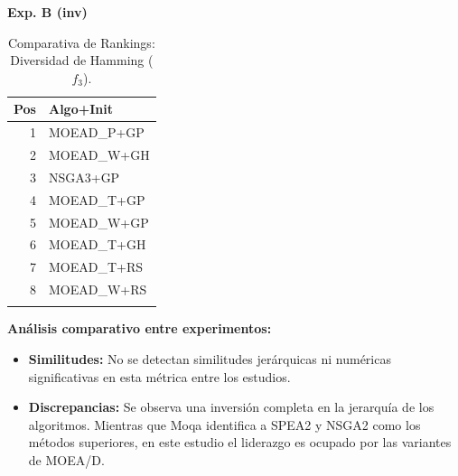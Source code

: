 \documentclass[a4paper,10pt]{article}
\begin{document}
\begin{table}[H]
\begin{minipage}[t]{0.32\textwidth}
        \centering\scriptsize\textbf{Exp. B (inv)}\\
        \begin{tabular}{rl}
            \toprule
            Pos & Algo+Init \\ \midrule
            1 & MOEAD\_P+GP \\
            2 & MOEAD\_W+GH \\
            3 & NSGA3+GP \\
            4 & MOEAD\_T+GP \\
            5 & MOEAD\_W+GP \\
            6 & MOEAD\_T+GH \\
            7 & MOEAD\_T+RS \\
            8 & MOEAD\_W+RS \\
            \\
            \bottomrule
        \end{tabular}
    \end{minipage}
    \caption{Comparativa de Rankings: Diversidad de Hamming ($f_3$).}
\end{table}

\textbf{Análisis comparativo entre experimentos:}
\begin{itemize}
    \item \textbf{Similitudes:} No se detectan similitudes jerárquicas ni numéricas significativas en esta métrica entre los estudios.
    \item \textbf{Discrepancias:} Se observa una inversión completa en la jerarquía de los algoritmos. Mientras que Moqa identifica a SPEA2 y NSGA2 como los métodos superiores, en este estudio el liderazgo es ocupado por las variantes de MOEA/D.
\end{itemize}
\end{document}
